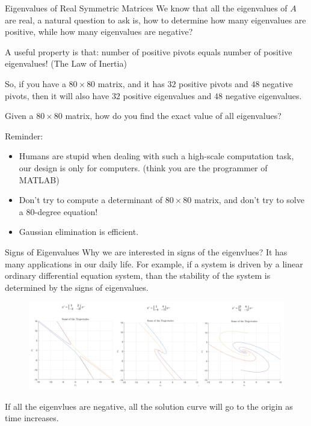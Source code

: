 \documentclass{beamer}
\begin{document}
\begin{frame}{Eigenvalues of Real Symmetric Matrices}
We know that all the eigenvalues of $A$ are real, a natural question to ask is, how to determine how many eigenvalues are positive, while how many eigenvalues are negative?

\vspace{3pt}
A useful property is that: number of positive pivots equals number of positive eigenvalues! (The Law of Inertia)

\vspace{3pt}
So, if you have a $80\times 80$ matrix, and it has $32$ positive pivots and $48$ negative pivots, then it will also have $32$ positive eigenvalues and $48$ negative eigenvalues.

\vspace{3pt}
Given a $80\times 80$ matrix, how do you find the exact value of all eigenvalues?

Reminder:
\begin{itemize}
    \item Humans are stupid when dealing with such a high-scale computation task, our design is only for computers. (think you are the programmer of MATLAB)
    \item Don't try to compute a determinant of $80\times 80$ matrix, and don't try to solve a $80$-degree equation!
    \item Gaussian elimination is efficient.
\end{itemize}
\end{frame}

\vspace{3pt}
\begin{frame}{Signs of Eigenvalues}
Why we are interested in signs of the eigenvlues? It has many applications in our daily life. For example, if a system is driven by a linear ordinary differential equation system, than the stability of the system is determined by the signs of eigenvalues.
\begin{figure}
\centering
\includegraphics[width=\textwidth]{ode.jpg}
\end{figure}
If all the eigenvlues are negative, all the solution curve will go to the origin as time increases.
\end{frame}
\end{document}
